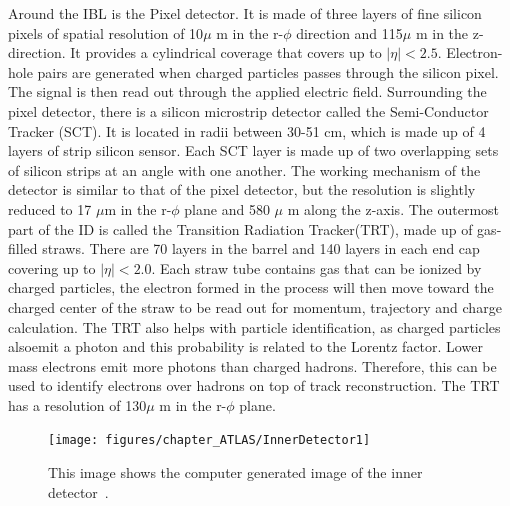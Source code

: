 Around the IBL is the Pixel detector. It is made of three layers of fine silicon pixels of spatial resolution of 10$\mu$ m in the r-$\phi$ direction and 115$\mu$ m in the z-direction. It provides a cylindrical coverage that covers up to $|\eta|<2.5$. Electron-hole pairs are generated when charged particles passes through the silicon pixel. The signal is then read out through the applied electric field.
Surrounding the pixel detector, there is a silicon microstrip detector called the Semi-Conductor Tracker (SCT). It is located in radii between 30-51 cm, which is made up of 4 layers of strip silicon sensor. Each SCT layer is made up of two overlapping sets of silicon strips at an angle with one another. The working mechanism of the detector is similar to that of the pixel detector, but the resolution is slightly reduced to 17 $\mu$m in the r-$\phi$ plane and 580 $\mu$ m along the z-axis. 
The outermost part of the ID is called the Transition Radiation Tracker(TRT), made up of gas-filled straws. There are 70 layers in the barrel and 140 layers in each end cap covering up to $|\eta|<2.0$. Each straw tube contains gas that can be ionized by charged particles, the electron formed in the process will then move toward the charged center of the straw to be read out for momentum, trajectory and charge calculation. The TRT also helps with particle identification, as charged particles alsoemit a photon and this probability is related to the Lorentz factor. Lower mass electrons emit more photons than charged hadrons. Therefore, this can be used to identify electrons over hadrons on top of track reconstruction. The TRT has a resolution of 130$\mu$ m in the r-$\phi$ plane.

\begin{figure}[!htb]
    \begin{center}
        \texttt{[image: figures/chapter\_ATLAS/InnerDetector1]}
        \caption{
            This image shows the computer generated image of the inner detector~\cite{Pequenao:1095926}.
        }
        \label{fig:InnerDetector}
    \end{center}
\end{figure}

